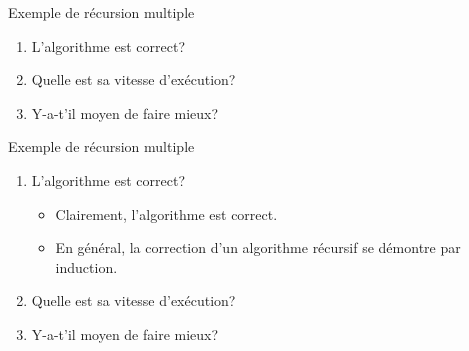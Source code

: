 \begin{frame}{Exemple de récursion multiple}

\begin{center}
\end{center}

\bigskip

\begin{enumerate}
\item L'algorithme est correct?
\item Quelle est sa vitesse d'exécution?
\item Y-a-t'il moyen de faire mieux?
\end{enumerate}

\end{frame}

\begin{frame}{Exemple de récursion multiple}

\begin{center}
\end{center}

\bigskip

\begin{enumerate}
\item L'algorithme est correct?
\begin{itemize}
\item Clairement, l'algorithme est correct.
\item En général, la correction d'un algorithme récursif se démontre par induction.
\end{itemize}
\item Quelle est sa vitesse d'exécution?
\item Y-a-t'il moyen de faire mieux?
\end{enumerate}

\end{frame}


